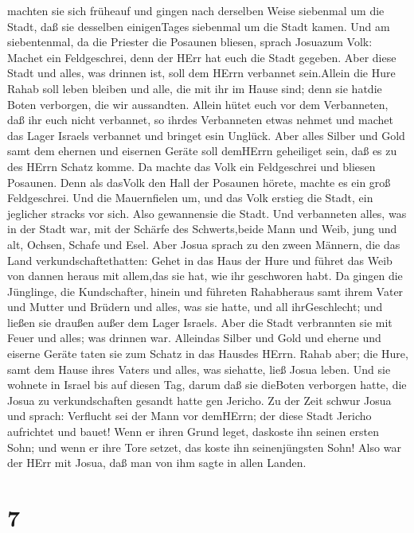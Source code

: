 machten sie sich früheauf und gingen nach derselben Weise siebenmal um
die Stadt, daß sie desselben einigenTages siebenmal um die Stadt kamen.
 Und am siebentenmal, da die Priester die Posaunen bliesen,
sprach Josuazum Volk: Machet ein Feldgeschrei, denn der HErr hat euch
die Stadt gegeben.  Aber diese Stadt und alles, was drinnen
ist, soll dem HErrn verbannet sein.Allein die Hure Rahab soll leben
bleiben und alle, die mit ihr im Hause sind; denn sie hatdie Boten
verborgen, die wir aussandten.  Allein hütet euch vor dem
Verbanneten, daß ihr euch nicht verbannet, so ihrdes Verbanneten etwas
nehmet und machet das Lager Israels verbannet und bringet esin Unglück.
 Aber alles Silber und Gold samt dem ehernen und eisernen
Geräte soll demHErrn geheiliget sein, daß es zu des HErrn Schatz komme.
 Da machte das Volk ein Feldgeschrei und bliesen Posaunen.
Denn als dasVolk den Hall der Posaunen hörete, machte es ein groß
Feldgeschrei. Und die Mauernfielen um, und das Volk erstieg die Stadt,
ein jeglicher stracks vor sich. Also gewannensie die Stadt.
 Und verbanneten alles, was in der Stadt war, mit der
Schärfe des Schwerts,beide Mann und Weib, jung und alt, Ochsen, Schafe
und Esel.  Aber Josua sprach zu den zween Männern, die das
Land verkundschaftethatten: Gehet in das Haus der Hure und führet das
Weib von dannen heraus mit allem,das sie hat, wie ihr geschworen habt.
 Da gingen die Jünglinge, die Kundschafter, hinein und
führeten Rahabheraus samt ihrem Vater und Mutter und Brüdern und alles,
was sie hatte, und all ihrGeschlecht; und ließen sie draußen außer dem
Lager Israels.  Aber die Stadt verbrannten sie mit Feuer
und alles; was drinnen war. Alleindas Silber und Gold und eherne und
eiserne Geräte taten sie zum Schatz in das Hausdes HErrn. 
Rahab aber; die Hure, samt dem Hause ihres Vaters und alles, was
siehatte, ließ Josua leben. Und sie wohnete in Israel bis auf diesen
Tag, darum daß sie dieBoten verborgen hatte, die Josua zu
verkundschaften gesandt hatte gen Jericho.  Zu der Zeit
schwur Josua und sprach: Verflucht sei der Mann vor demHErrn; der diese
Stadt Jericho aufrichtet und bauet! Wenn er ihren Grund leget, daskoste
ihn seinen ersten Sohn; und wenn er ihre Tore setzet, das koste ihn
seinenjüngsten Sohn!  Also war der HErr mit Josua, daß man
von ihm sagte in allen Landen.

\hypertarget{section-6}{%
\section{7}\label{section-6}}

